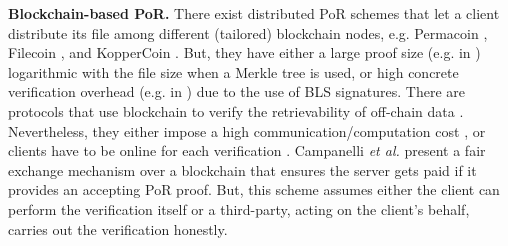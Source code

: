 

\noindent\textbf{Blockchain-based PoR.} There exist distributed PoR schemes that let a client  distribute its file among different (tailored) blockchain nodes,  e.g. Permacoin \cite{MillerPermacoin}, Filecoin  \cite{Filecoin}, and KopperCoin \cite{KoppBK16}. But,  they have either a large proof size (e.g. in \cite{MillerPermacoin,Filecoin})  logarithmic with the  file size when a  Merkle tree is used, or high concrete verification overhead (e.g. in \cite{KoppBK16}) due to the use of BLS signatures. There are protocols that use blockchain to verify the retrievability of off-chain data \cite{RennerMK18,HaoXWJW18,ZhangDLZ18,Audita18,blockchain-data-audit-18,sia14}. Nevertheless, they either impose a high communication/computation cost \cite{RennerMK18,HaoXWJW18,Audita18,blockchain-data-audit-18,sia14}, or  clients have to be online for each verification  \cite{ZhangDLZ18}.  Campanelli \textit{et al.}  \cite{CampanelliGGN17}  present a fair exchange mechanism over a blockchain that ensures the server gets paid if it provides an accepting PoR proof. But, this scheme assumes either the client can   perform the verification itself or a third-party, acting on the client's behalf,  carries out the verification honestly. 












